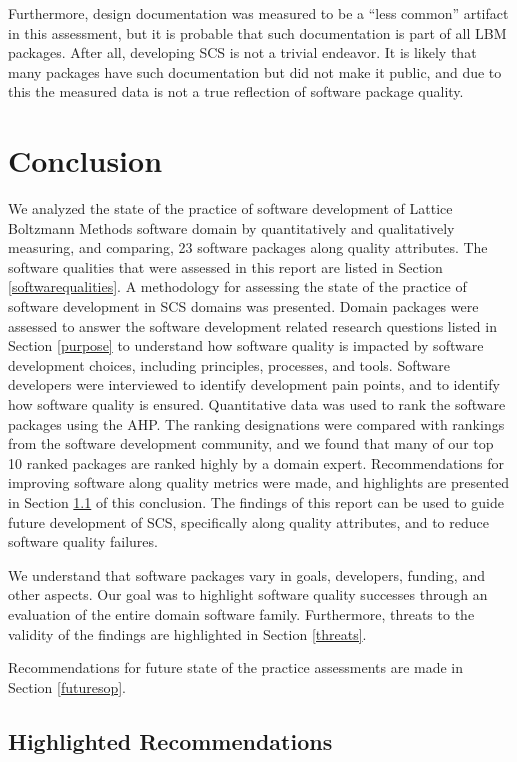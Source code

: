 \documentclass[12pt, notitlepage]{article}
\begin{document}
Furthermore, design documentation was measured to be a ``less common'' artifact in this assessment, but it is probable that such documentation is part of all LBM packages. After all, developing SCS is not a trivial endeavor. It is likely that many packages have such documentation but did not make it public, and due to this the measured data is not a true reflection of software package quality.

\newpage
\section{Conclusion}\label{conclusion}

We analyzed the state of the practice of software development of Lattice Boltzmann Methods software domain by quantitatively and qualitatively measuring, and comparing, 23 software packages along quality attributes. The software qualities that were assessed in this report are listed in Section \ref{softwarequalities}. A methodology for assessing the state of the practice of software development in SCS domains was presented. Domain packages were assessed to answer the software development related research questions listed in Section \ref{purpose} to understand how software quality is impacted by software development choices, including principles, processes, and tools. Software developers were interviewed to identify development pain points, and to identify how software quality is ensured. Quantitative data was used to rank the software packages using the AHP. The ranking designations were compared with rankings from the software development community, and we found that many of our top 10 ranked packages are ranked highly by a domain expert. Recommendations for improving software along quality metrics were made, and highlights are presented in Section \ref{highlightedrecommendations} of this conclusion. The findings of this report can be used to guide future development of SCS, specifically along quality attributes, and to reduce software quality failures.

We understand that software packages vary in goals, developers, funding, and other aspects. Our goal was to highlight software quality successes through an evaluation of the entire domain software family. Furthermore, threats to the validity of the findings are highlighted in Section \ref{threats}. 

Recommendations for future state of the practice assessments are made in Section \ref{futuresop}.

\subsection{Highlighted Recommendations}\label{highlightedrecommendations}
\end{document}
